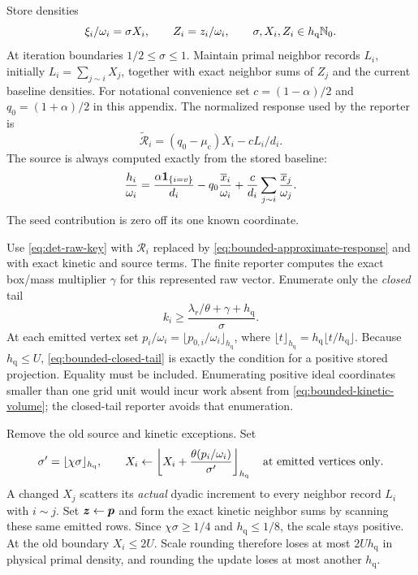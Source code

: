Store densities
\begin{equation*}
 \xi_i/\omega_i=\sigma X_i,\qquad Z_i=z_i/\omega_i,
 \qquad \sigma,X_i,Z_i\in h_{\mathrm{q}}\mathbb{N}_0.
\end{equation*}
At iteration boundaries $1/2\leq\sigma\leq1$.
Maintain primal neighbor records $L_i$, initially
$L_i=\sum_{j\sim i}X_j$, together with exact neighbor sums of $Z_j$
and the current baseline densities. For notational convenience set
$c=(1-\alpha)/2$ and $q_0=(1+\alpha)/2$ in this appendix.
The normalized response used by the reporter is
\begin{equation}
 \widetilde{\mathscr R}_i=(q_0-\mu_{\mathrm{c}})X_i-cL_i/d_i.
 \label{eq:bounded-approximate-response}
\end{equation}
The source is always computed exactly from the stored baseline:
\begin{equation}
 \frac{h_i}{\omega_i}
 =\frac{\alpha\mathbf{1}_{\{i=v\}}}{d_i}
    -q_0\frac{\overline x_i}{\omega_i}
    +\frac c{d_i}\sum_{j\sim i}\frac{\overline x_j}{\omega_j}.
 \label{eq:bounded-exact-source}
\end{equation}
The seed contribution is zero off its one known coordinate.

Use \cref{eq:det-raw-key} with
$\mathscr R_i$ replaced by \cref{eq:bounded-approximate-response} and
with exact kinetic and source terms. The finite reporter computes the exact
box/mass multiplier $\gamma$ for this represented raw vector. Enumerate
only the \emph{closed} tail
\begin{equation}
 k_i\geq\frac{\lambda_r/\theta+\gamma+h_{\mathrm{q}}}{\sigma}.
 \label{eq:bounded-closed-tail}
\end{equation}
At each emitted vertex set
$p_i/\omega_i=\lfloor p_{0,i}/\omega_i\rfloor_{h_{\mathrm{q}}}$, where
$\lfloor t\rfloor_{h_{\mathrm{q}}}=h_{\mathrm{q}}\lfloor t/h_{\mathrm{q}}\rfloor$.
Because $h_{\mathrm{q}}\leq U$, \cref{eq:bounded-closed-tail} is exactly the
condition for a positive stored projection. Equality must be included.
Enumerating positive ideal coordinates smaller than one grid unit would
incur work absent from \cref{eq:bounded-kinetic-volume}; the closed-tail
reporter avoids that enumeration.

Remove the old source and kinetic exceptions. Set
\begin{equation*}
 \sigma'=\lfloor\chi\sigma\rfloor_{h_{\mathrm{q}}},\qquad
 X_i\gets\left\lfloor
 X_i+\frac{\theta(p_i/\omega_i)}{\sigma'}
 \right\rfloor_{h_{\mathrm{q}}}\quad\hbox{at emitted vertices only}.
\end{equation*}
A changed $X_j$ scatters its \emph{actual} dyadic increment to every
neighbor record $L_i$ with $i\sim j$. Set $\bm{z}\gets\bm{p}$ and form the
exact kinetic neighbor sums by scanning these same emitted rows.
Since $\chi\sigma\geq1/4$ and $h_{\mathrm{q}}\leq1/8$, the scale stays
positive. At the old boundary $X_i\leq2U$. Scale rounding therefore loses
at most $2Uh_{\mathrm{q}}$ in physical primal density, and rounding the update
loses at most another $h_{\mathrm{q}}$.

